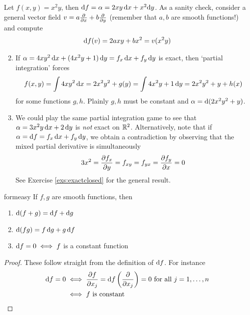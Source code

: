 \begin{examples}{}{}
\exstart Let $f(x,y)=x^2y$, then $\df=\alpha=2xy\,\dx+x^2\dy$. As a sanity check, consider a general vector field $v=a\partials x+b\partials y$ (remember that $a,b$ are smooth functions!) and compute 
\[\df(v)=2axy+bx^2=v(x^2y)\]
\begin{enumerate}\setcounter{enumi}{1}
  \item If $\alpha=4xy^2\,\dx+(4x^2y+1)\,\dy=f_x\,\dx+f_y\,\dy$ is exact, then `partial integration' forces
  \[f(x,y)=\int 4xy^2\,\dx=2x^2y^2+g(y) =\int 4x^2y+1\,\dy=2x^2y^2+y+h(x)\]
  for some functions $g,h$. Plainly $g,h$ must be constant and $\alpha=\D(2x^2y^2+y)$.
  
  \item We could play the same partial integration game to see that $\alpha=3x^2y\,\dx+2\,\dy$ is \emph{not} exact on $\R^2$. Alternatively, note that if $\alpha=\df=f_x\,\dx+f_y\,\dy$, we obtain a contradiction by observing that the mixed partial derivative is simultaneously
  \[3x^2=\partials[f_x]{y}=f_{xy}=f_{yx}=\partials[f_y]{x}=0\]
  See Exercise \ref{exs:exactclosed} for the general result.
\end{enumerate}
\end{examples}


\begin{lemm}{}{formeasy}
If $f,g$ are smooth functions, then
\begin{enumerate}
\item $\D(f+g)=\df+\dg$
\item $\D(fg)=f\,\dg+g\,\df$
\item $\df=0\iff f$ is a constant function
\end{enumerate}
\end{lemm}

\begin{proof}
These follow straight from the definition of $\df$. For instance
\begin{align*}
\df=0&\iff \partials[f]{x_j}=\df\left(\partials{x_j}\right)=0\text{ for all }j=1,\ldots,n\\
&\iff f\text{ is constant}\tag*{\qedhere}
\end{align*}
\end{proof}

